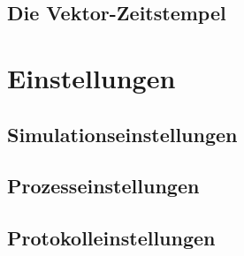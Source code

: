 \subsection{Die Vektor-Zeitstempel}

\section{Einstellungen}

\subsection{Simulationseinstellungen}

\subsection{Prozesseinstellungen}

\subsection{Protokolleinstellungen}


